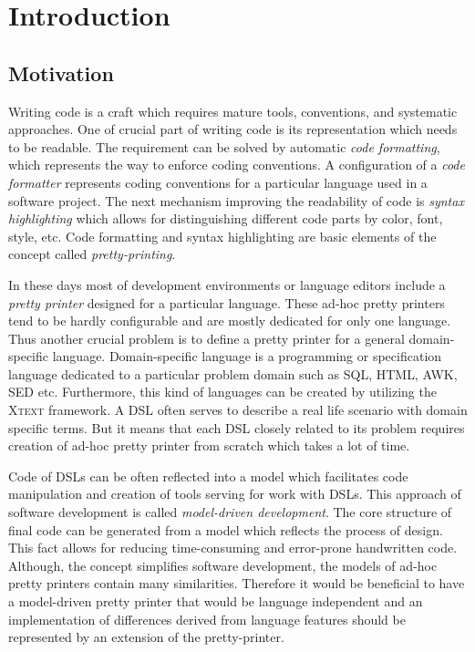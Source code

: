 \documentclass[12pt,notitlepage,a4paper]{report}
\begin{document}
\newcommand{\member}[2]{\item [#1] \hfill \\ #2}


\chapter{Introduction}

\section{Motivation}

Writing code is a craft which requires mature tools, conventions, and systematic approaches. One of crucial part of writing code is its representation which needs to be readable. The requirement can be solved by automatic \textit{code formatting}, which represents the way to enforce coding conventions. A configuration of a \textit{code formatter} represents coding conventions for a particular language used in a software project. The next mechanism improving the readability of code is \textit{syntax highlighting} which allows for distinguishing different code parts  by color, font, style, etc. Code formatting and syntax highlighting are basic elements of the concept called \textit{pretty-printing}. 

In these days most of development environments or language editors include a \textit{pretty printer} designed for a particular language.  These ad-hoc pretty printers tend to be hardly configurable and are mostly dedicated for only one language. Thus another crucial problem is to define a pretty printer for a general domain-specific language. Domain-specific language is a programming or specification language dedicated to a particular problem domain such as SQL, HTML, AWK, SED etc. Furthermore, this kind of languages can be created by utilizing the \textsc{Xtext} framework. A DSL often serves to describe a real life scenario with domain specific terms.  But it means that each DSL closely related to its problem requires creation of ad-hoc pretty printer from scratch which takes a lot of time.

Code of DSLs can be often reflected into a model which facilitates code manipulation and creation of tools serving for work with DSLs. This approach of software development is called \textit{model-driven development}. The core structure of final code can be generated from a model which reflects the process of design. This fact allows for reducing time-consuming and error-prone handwritten code. Although, the concept simplifies software development, the models of ad-hoc pretty printers contain many similarities. Therefore it would be beneficial to have a model-driven pretty printer that would be language independent and an implementation of differences derived from language features should be represented by an extension of the pretty-printer.
\end{document}
